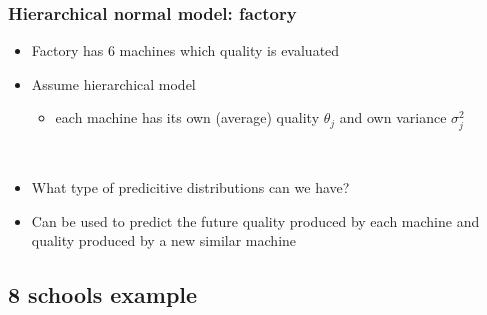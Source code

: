 \documentclass[10pt]{beamer}
\begin{document}
\begin{frame}

\frametitle{Hierarchical normal model: factory}

  \begin{itemize}
  \item Factory has 6 machines which quality is evaluated
  \item Assume hierarchical model
    \begin{itemize}
    \item each machine has its own (average) quality $\theta_j$ and
      {\color{uured} own variance} $\sigma_j^2$
    \end{itemize}
\hspace{-1cm}~\begin{minipage}[b]{4cm}
      \begin{xy}
      \end{xy}
    \end{minipage}
    \pause
  \item {\color{uured} What type of predicitive distributions can we have?}
    \pause
  \item Can be used to predict the future quality produced by each machine and quality produced by a new similar machine
  \end{itemize}
\end{frame}

\subsection{8 schools example}
\end{document}
